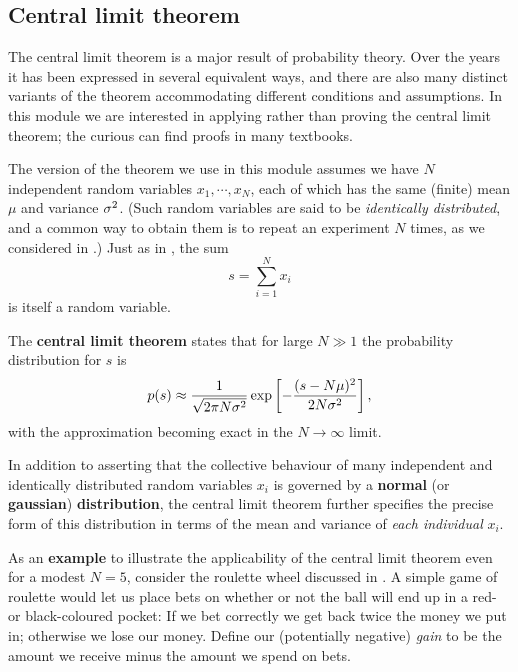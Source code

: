 \subsection{\label{sec:CLT}Central limit theorem}
The central limit theorem is a major result of probability theory.
Over the years it has been expressed in several equivalent ways, and there are also many distinct variants of the theorem accommodating different conditions and assumptions.
In this module we are interested in applying rather than proving the central limit theorem; the curious can find proofs in many textbooks.

The version of the theorem we use in this module assumes we have $N$ independent random variables $x_1, \cdots, x_N$, each of which has the same (finite) mean $\mu$ and variance $\sigma^2$.
(Such random variables are said to be \textit{identically distributed}, and a common way to obtain them is to repeat an experiment $N$ times, as we considered in .)
Just as in , the sum
\begin{equation}
  \label{eq:CLTsum}
  s = \sum_{i = 1}^N x_i
\end{equation}
is itself a random variable.

\begin{shaded}
  The \textbf{central limit theorem} states that for large $N \gg 1$ the probability distribution for $s$ is
  \begin{equation}
    \label{eq:CLT}
    p(s) \approx \frac{1}{\sqrt{2\pi N\sigma^2}} \exp\left[-\frac{(s - N\mu)^2}{2N\sigma^2}\right],
  \end{equation}
  with the approximation becoming exact in the $N \to \infty$ limit.
\end{shaded}
In addition to asserting that the collective behaviour of many independent and identically distributed random variables $x_i$ is governed by a \textbf{normal} (or \textbf{gaussian}) \textbf{distribution}, the central limit theorem further specifies the precise form of this distribution in terms of the mean and variance of \textit{each individual} $x_i$.

As an \textbf{example} to illustrate the applicability of the central limit theorem even for a modest $N = 5$, consider the roulette wheel discussed in .
A simple game of roulette would let us place bets on whether or not the ball will end up in a red- or black-coloured pocket: If we bet correctly we get back twice the money we put in; otherwise we lose our money.
Define our (potentially negative) \textit{gain} to be the amount we receive minus the amount we spend on bets.

